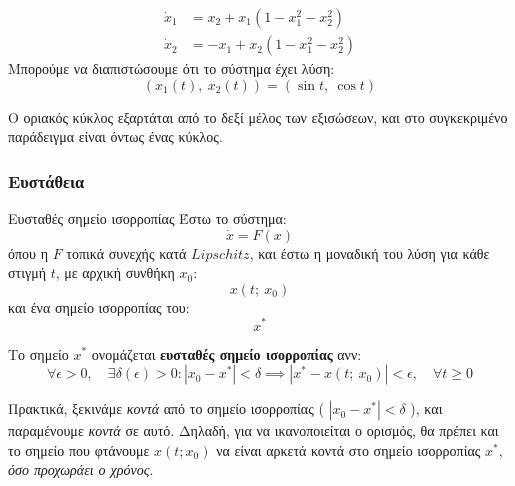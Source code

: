 \documentclass[11pt,a4paper,notitlepage,fleqn]{article}
\begin{document}
\begin{exercise}[Παράδειγμα]
	\begin{align*}
		\dot x_1 &= x_2 + x_1(1-x_1^2-x_2^2) \\
		\dot x_2 &= -x_1+x_2(1-x_1^2-x_2^2)
	\end{align*}
	\tcblower
	Μπορούμε να διαπιστώσουμε ότι το σύστημα έχει λύση:
	\[
	\left(
	x_1(t),\ x_2(t)
	\right) = \left(
	\sin t,\ \cos t
	\right)
	\]
	
	Ο οριακός κύκλος εξαρτάται από το δεξί μέλος των εξισώσεων, και στο συγκεκριμένο
	παράδειγμα είναι όντως ένας κύκλος.
\end{exercise}

\subsubsection{Ευστάθεια}
\begin{defn}{Ευσταθές σημείο ισορροπίας}{}
	Έστω το σύστημα:
	\[
	\dot x = F(x)
	\]
	όπου η \( F \) τοπικά συνεχής κατά \( Lipschitz \),
	και έστω η μοναδική του λύση για κάθε στιγμή \( t \), με αρχική συνθήκη \( x_0 \):
	\[
	x(t;\ x_0)
	\]
	και ένα σημείο ισορροπίας του:
	\[
	x^*
	\]
	
	Το σημείο \( x^* \) ονομάζεται \textbf{ευσταθές σημείο ισορροπίας} ανν:
	\[
	\forall \epsilon > 0,\quad
	\exists \delta(\epsilon) > 0 :
	\left|x_0-x^*\right| < \delta
	\implies \left| x^*-x(t;\ x_0) \right| < \epsilon,\quad \forall t \geq 0
	\]
\end{defn}

Πρακτικά, ξεκινάμε \textit{κοντά} από το σημείο ισορροπίας ( \( \left|x_0-x^*\right| < \delta \) ), και παραμένουμε \textit{κοντά}
σε αυτό. Δηλαδή, για να ικανοποιείται ο ορισμός, θα
πρέπει και το σημείο που φτάνουμε \( x(t; x_0) \) να είναι αρκετά κοντά στο σημείο ισορροπίας
\( x^* \), \textit{όσο προχωράει ο χρόνος}.
\end{document}
